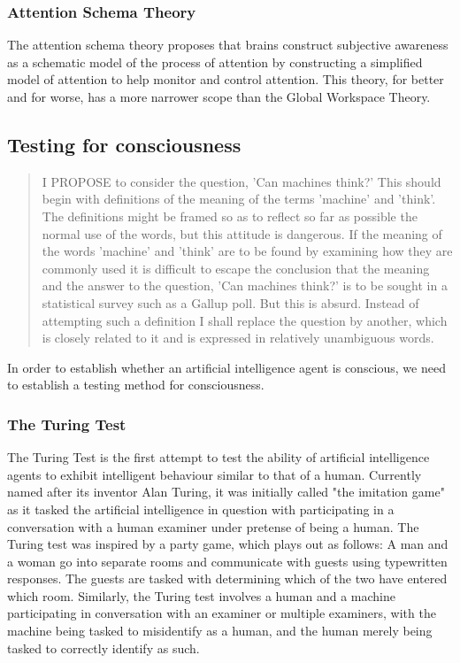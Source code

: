 \documentclass[masterthesis]{fer}
\begin{document}
\subsubsection{Attention Schema Theory}
The attention schema theory proposes that brains construct subjective awareness as a schematic model of the process of attention by constructing a simplified model of attention to help monitor and control attention.
This theory, for better and for worse, has a more narrower scope than the Global Workspace Theory.
\subsection{Testing for consciousness}
\begin{quote}
I PROPOSE to consider the question, 'Can machines think?' This should begin with definitions of the meaning of the terms 'machine' and 'think'. The definitions might be framed so as to reflect so far as possible the normal use of the words, but this attitude is dangerous. If the meaning of the words 'machine' and 'think' are to be found by examining how they are commonly used it is difficult to escape the conclusion that the meaning and the answer to the question, 'Can machines think?' is to be sought in a statistical survey such as a Gallup poll. But this is absurd. Instead of attempting such a definition I shall replace the question by another, which is closely related to it and is expressed in relatively unambiguous words. 
\cite{turing1}
\end{quote}
In order to establish whether an artificial intelligence agent is conscious, we need to establish a testing method for consciousness.

\subsubsection{The Turing Test}
The Turing Test is the first attempt to test the ability of artificial intelligence agents to exhibit intelligent behaviour similar to that of a human.
Currently named after its inventor Alan Turing, it was initially called "the imitation game" as it tasked the artificial intelligence in question with participating in a conversation with a human examiner under pretense of being a human.
The Turing test was inspired by a party game, which plays out as follows: A man and a woman go into separate rooms and communicate with guests using typewritten responses. The guests are tasked with determining which of the two have entered which room.
Similarly, the Turing test involves a human and a machine participating in conversation with an examiner or multiple examiners, with the machine being tasked to misidentify as a human, and the human merely being tasked to correctly identify as such.
\end{document}
